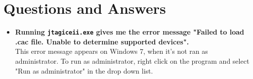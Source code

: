 \documentclass[a4paper, twoside, final]{book}%
\begin{document}
\lstset{language=C}

\chapter{Questions and Answers}
\begin{itemize}
  \item {\bf Running {\tt jtagiceii.exe} gives me the error message "Failed to load .cac file. Unable to determine supported devices".}\\
  This error message appears on Windows 7, when it's not ran as administrator. To run as administrator, right click on the program and select "Run as administrator" in the drop down list.
\end{itemize}
\end{document}
